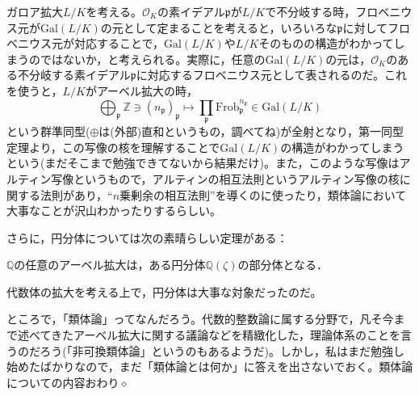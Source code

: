 ガロア拡大$L/K$を考える。$\mathcal{O}_K$の素イデアル$\mathfrak{p}$が$L/K$で不分岐する時，フロベニウス元が$\mathrm{Gal}(L/K)$の元として定まることを考えると，いろいろな$\mathfrak{p}$に対してフロベニウス元が対応することで，$\mathrm{Gal}(L/K)$や$L/K$そのものの構造がわかってしまうのではないか，と考えられる。実際に，任意の$\mathrm{Gal}(L/K)$の元は，$\mathcal{O}_K$のある不分岐する素イデアル$\mathfrak{p}$に対応するフロベニウス元として表されるのだ。これを使うと，$L/K$がアーベル拡大の時，\[
\bigoplus_{\mathfrak{p}}\mathbb{Z}\ni (n_{\mathfrak{p}})_{\mathfrak{p}}\mapsto\prod_{\mathfrak{p}}\mathrm{Frob}_{\mathfrak{p}}^{n_{\mathfrak{p}}}\in\mathrm{Gal}(L/K)
\]という群準同型($\oplus$は(外部)直和というもの，調べてね)が全射となり，第一同型定理より，この写像の核を理解することで$\mathrm{Gal}(L/K)$の構造がわかってしまうという(まだそこまで勉強できてないから結果だけ)。また，このような写像はアルティン写像というもので，アルティンの相互法則というアルティン写像の核に関する法則があり，``$n$乗剰余の相互法則''を導くのに使ったり，類体論において大事なことが沢山わかったりするらしい。

さらに，円分体については次の素晴らしい定理がある：
\begin{thm}
    $\mathbb{Q}$の任意のアーベル拡大は，ある円分体$\mathbb{Q}(\zeta)$の部分体となる．
\end{thm}
代数体の拡大を考える上で，円分体は大事な対象だったのだ。

ところで，「類体論」ってなんだろう。代数的整数論に属する分野で，凡そ今まで述べてきたアーベル拡大に関する議論などを精緻化した，理論体系のことを言うのだろう(「非可換類体論」というのもあるようだ)。しかし，私はまだ勉強し始めたばかりなので，まだ「類体論とは何か」に答えを出さないでおく。類体論についての内容おわり$\diamond$









